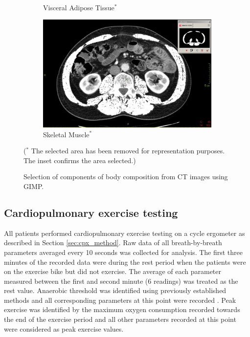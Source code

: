\begin{figure}[htbp]
\begin{subfigure}{0.45\textwidth}
		\caption{Visceral Adipose Tissue$^*$}
		\label{fig:bc_ct_vat}
	\end{subfigure}
	\begin{subfigure}{0.45\textwidth}
		\centering
		\includegraphics[width=\textwidth]{Figures/bc_ct_sm}
		\caption{Skeletal Muscle$^*$}
		\label{fig:bc_ct_sm}
	\end{subfigure}
	
	\caption{Selection of components of body composition from CT images using GIMP.}($^*$ The selected area has been removed for representation purposes. 
The inset confirms the area selected.)
	\label{fig:bc_ct_gimp}
	
\end{figure}

\subsection{Cardiopulmonary exercise testing}
All patients performed cardiopulmonary exercise testing on a cycle ergometer as described in Section \ref{sec:cpx_method}. 
Raw data of all breath-by-breath parameters averaged every 10 seconds was collected for analysis. 
The first three minutes of the recorded data were during the rest period when the patients were on the exercise bike but did not exercise. 
The average of each parameter measured between the first and second minute (6 readings) was treated as the rest value. 
Anaerobic threshold was identified using previously established methods and all corresponding parameters at this point were recorded \parencite{beaver_new_1986,sue_metabolic_1988}. 
Peak exercise was identified by the maximum oxygen consumption recorded towards the end of the exercise period and all other parameters recorded at this point were considered as peak exercise values. 

